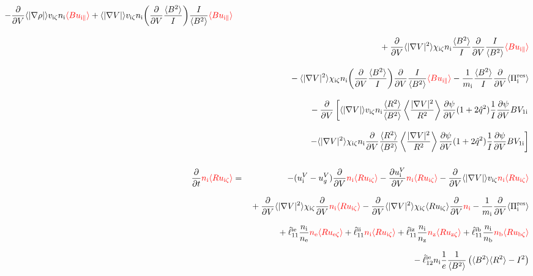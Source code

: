 \documentclass[11pt]{article}
\def\r#1{{\rm#1}}
\def\ave#1{\left\langle#1\right\rangle}
\def\aves#1{\langle#1\rangle}
\def\dd#1#2{\frac{\partial #1}{\partial #2}}
\def\para{\parallel}
\def\ddV{\frac{\partial}{\partial V}}
\def\ddt{\frac{\partial}{\partial t}}
\def\mi{m_\r{i}}
\def\nee{n_\r{e}}
\def\ni{n_\r{i}}
\def\nz{n_\r{z}}
\def\nb{n_\r{b}}
\def\uzt#1{u_{\r{#1}\zeta}}
\def\upara#1{u_{\r{#1}\para}}
\def\qhatpara#1{\hat{q}_{\r{#1}\para}}
\def\uV#1{u_\r{#1}^V}
\def\ugV{u_{g}^V}
\def\chis#1{\chi_\r{#1}}
\def\bri{\aves{B^2}\aves{R^2} - I^2}
\def\red#1{\textcolor{red}{#1}}
\begin{document}
\begin{eqnarray}
%
  - \ddV \aves{|\nabla \rho|} v_{\r{i}\zeta} \ni \red{\aves{B \upara{i}}}
%
  + \aves{|\nabla V|} v_{\r{i}\zeta} \ni 
  \biggl(\ddV \frac{\aves{B^2}}{I} \biggl) \frac{I}{\aves{B^2}} \red{\aves{B \upara{i}}}
\nonumber\\[3mm]&&{}
%
  + \ddV \aves{|\nabla V|^2} \chis{i\zeta} \ni
  \frac{\aves{B^2}}{I} \ddV \frac{I}{\aves{B^2}} \red{\aves{B \upara{i}}}
\nonumber\\[3mm]&&{}
%
  - \aves{|\nabla V|^2} \chis{i\zeta} \ni \biggl( \ddV
  \frac{\aves{B^2}}{I} \biggr) \ddV \frac{I}{\aves{B^2}} \red{\aves{B \upara{i}}}
%
  - \frac{1}{\mi} \frac{\aves{B^2}}{I} \ddV \aves{\Pi_\r{i}^\r{res}}
\nonumber\\[3mm]&&{}
%
  - \ddV
    \left[  \aves{|\nabla V|} v_{\r{i}\zeta} \ni
            \frac{\aves{R^2}}{\aves{B^2}}\ave{\frac{|\nabla V|^2}{R^2}}\dd{\psi}{V}(1+2\hat{q}^2)
	    \frac{1}{I} \dd{\psi}{V} BV_{1\r{i}} \right.
\nonumber\\[3mm]&&{}
    \left.- \aves{|\nabla V|^2} \chis{i\zeta} \ni
          \ddV \frac{\aves{R^2}}{\aves{B^2}}\ave{\frac{|\nabla V|^2}{R^2}}\dd{\psi}{V}(1+2\hat{q}^2)
	  \frac{1}{I} \dd{\psi}{V} BV_{1\r{i}}\right]
\\[5mm]
  \ddt \red{\ni \aves{R \uzt{i}}} &=&
%
  - (\uV{i} - \ugV) \ddV \red{\ni \aves{R \uzt{i}}}
%
  - \dd{\uV{i}}{V} \red{\ni \aves{R \uzt{i}}}
%
  - \ddV \aves{|\nabla V|} v_{\r{i}\zeta} \red{\ni \aves{R \uzt{i}}}
\nonumber\\[3mm]&&{}
  + \ddV \aves{|\nabla V|^2} \chis{i\zeta} \ddV \red{\ni \aves{R \uzt{i}}}
  - \ddV \aves{|\nabla V|^2} \chis{i\zeta} \aves{R \uzt{i}}\ddV \red{\ni} 
  - \frac{1}{\mi} \ddV \aves{\Pi_\r{i}^\r{res}}
\nonumber\\[2.5mm]&&{}
%
  + \hat{\ell}_{11}^\r{ie} \frac{\ni}{\nee} \red{\nee \aves{R \uzt{e}}}
  + \hat{\ell}_{11}^\r{ii}                  \red{\ni  \aves{R \uzt{i}}}
  + \hat{\ell}_{11}^\r{iz} \frac{\ni}{\nz}  \red{\nz  \aves{R \uzt{z}}}
  + \hat{\ell}_{11}^\r{ib} \frac{\ni}{\nb}  \red{\nb  \aves{R \uzt{b}}}
\nonumber\\[2.5mm]&&{}
%
  - \hat{\ell}_{12}^\r{ie} \ni \frac{1}{e} \frac{1}{\aves{B^2}} \left( \bri \right)

\end{eqnarray}
\end{document}
